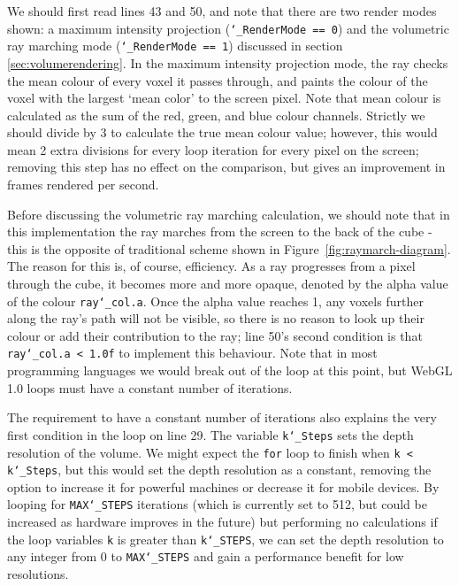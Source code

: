 We should first read lines 43 and 50, and note that there are two render modes shown: a maximum intensity projection (\texttt{\char`_RenderMode == 0}) and the volumetric ray marching mode (\texttt{\char`_RenderMode == 1}) discussed in section \ref{sec:volumerendering}.
In the maximum intensity projection mode, the ray checks the mean colour of every voxel it passes through, and paints the colour of the voxel with the largest `mean color' to the screen pixel.
Note that mean colour is calculated as the sum of the red, green, and blue colour channels.
Strictly we should divide by $3$ to calculate the true mean colour value; however, this would mean 2 extra divisions for every loop iteration for every pixel on the screen; removing this step has no effect on the comparison, but gives an improvement in frames rendered per second. 

Before discussing the volumetric ray marching calculation, we should note that in this implementation the ray marches from the screen to the back of the cube - this is the opposite of traditional scheme shown in Figure~\ref{fig:raymarch-diagram}.
The reason for this is, of course, efficiency.
As a ray progresses from a pixel through the cube, it becomes more and more opaque, denoted by the alpha value of the colour \texttt{ray\char`_col.a}.
Once the alpha value reaches 1, any voxels further along the ray's path will not be visible, so there is no reason to look up their colour or add their contribution to the ray; line 50's second condition is that \texttt{ray\char`_col.a < 1.0f} to implement this behaviour.
Note that in most programming languages we would break out of the loop at this point, but WebGL 1.0 loops must have a constant number of iterations.

The requirement to have a constant number of iterations also explains the very first condition in the loop on line 29.
The variable \texttt{k\char`_Steps} sets the depth resolution of the volume.
We might expect the \texttt{for} loop to finish when \texttt{k < k\char`_Steps}, but this would set the depth resolution as a constant, removing the option to increase it for powerful machines or decrease it for mobile devices.
By looping for \texttt{MAX\char`_STEPS} iterations (which is currently set to 512, but could be increased as hardware improves in the future) but performing no calculations if the loop variables \texttt{k} is greater than \texttt{k\char`_STEPS}, we can set the depth resolution to any integer from 0 to \texttt{MAX\char`_STEPS} and gain a performance benefit for low resolutions.

